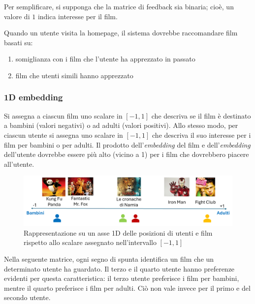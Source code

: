 Per semplificare, si supponga che la matrice di feedback sia binaria; cioè, un valore di $1$ indica interesse per il film.

Quando un utente visita la homepage, il sistema dovrebbe raccomandare film basati su:

\begin{enumerate}
    \item somiglianza con i film che l'utente ha apprezzato in passato
    \item film che utenti simili hanno apprezzato
\end{enumerate}

\subsubsection{1D embedding}

Si assegna a ciascun film uno scalare in $[-1, 1]$ che descriva se il film è destinato a bambini (valori negativi) o ad adulti (valori positivi). Allo stesso modo, per ciascun utente si assegna uno scalare in $[-1, 1]$ che descriva il suo interesse per i film per bambini o per adulti. Il prodotto dell’\textit{embedding} del film e dell’\textit{embedding} dell’utente dovrebbe essere più alto (vicino a 1) per i film che dovrebbero piacere all’utente.

\begin{figure}[H]
    \centering
    \includegraphics[scale=0.4]{figures/collaborative_filtering/embeddings.PNG}
    \caption{Rappresentazione su un asse 1D delle posizioni di utenti e film rispetto allo scalare assegnato nell'intervallo $[-1, 1]$}
    \label{fig:embeddings}
\end{figure}

Nella seguente matrice, ogni segno di spunta identifica un film che un determinato utente ha guardato. Il terzo e il quarto utente hanno preferenze evidenti per questa caratteristica: il terzo utente preferisce i film per bambini, mentre il quarto preferisce i film per adulti. Ciò non vale invece per il primo e del secondo utente.

